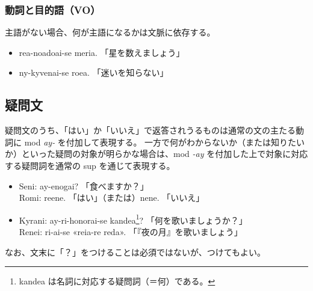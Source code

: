 \subsubsection{動詞と目的語（VO）}
主語がない場合、何が主語になるかは文脈に依存する。

\begin{itemize}
    \item rea-noadoai-se meria. 「星を数えましょう」
    \item ny-kyvenai-se roea. 「迷いを知らない」
\end{itemize}

\clearpage

\subsection{疑問文}

疑問文のうち、「はい」か「いいえ」で返答されうるものは通常の文の主たる動詞に mod \emph{ay-} を付加して表現する。
一方で何がわからないか（または知りたいか）といった疑問の対象が明らかな場合は、mod \emph{-ay} を付加した上で対象に対応する疑問詞を通常の sup を通じて表現する。

\begin{itemize}
    \item Seni: ay-enogai? 「食べますか？」 \\ Romi: reene. 「はい」（または）nene. 「いいえ」
    \item Kyrani: ay-ri-honorai-se kandea\footnote{kandea は名詞に対応する疑問詞（＝何）である。}? 「何を歌いましょうか？」\\ Renei: ri-ai-se «reia-re reda». 「『夜の月』を歌いましょう」
\end{itemize}

なお、文末に「？」をつけることは必須ではないが、つけてもよい。